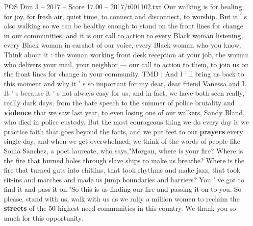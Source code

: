 \begin{textsample}{POS Dim 3 – 2017 – Score 17.00 – 2017/t001102.txt}
Our walking is for healing, for joy, for fresh air, quiet time, to connect and disconnect, to worship.
But it ' s also walking so we can be healthy enough to stand on the front lines for change in our communities, and it is our call to action to every Black woman listening, every Black woman in earshot of our voice, every Black woman who you know.
Think about it : the woman working front desk reception at your job, the woman who delivers your mail, your neighbor — our call to action to them, to join us on the front lines for change in your community.
TMD : And I ' ll bring us back to this moment and why it ' s so important for my dear, dear friend Vanessa and I.
It ' s because it ' s not always easy for us, and in fact, we have both seen really, really dark days, from the hate speech to the summer of police brutality and \textbf{violence} that we saw last year, to even losing one of our walkers, Sandy Bland, who died in police custody.
But the most courageous thing we do every day is we practice faith that goes beyond the facts, and we put feet to our \textbf{prayers} every single day, and when we get overwhelmed, we think of the words of people like Sonia Sanchez, a poet laureate, who says,"Morgan, where is your fire?
Where is the fire that burned holes through slave ships to make us breathe?
Where is the fire that turned guts into chitlins, that took rhythms and make jazz, that took sit-ins and marches and made us jump boundaries and barriers?
You ' ve got to find it and pass it on."So this is us finding our fire and passing it on to you.
So please, stand with us, walk with us as we rally a million women to reclaim the \textbf{streets} of the 50 highest need communities in this country.
We thank you so much for this opportunity.

\end{textsample}
